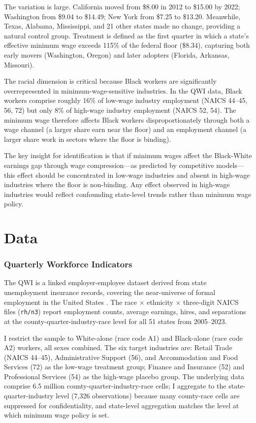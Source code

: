 \documentclass[12pt]{article}
\begin{document}
The variation is large. California moved from \$8.00 in 2012 to \$15.00 by 2022; Washington from \$9.04 to \$14.49; New York from \$7.25 to \$13.20. Meanwhile, Texas, Alabama, Mississippi, and 21 other states made no change, providing a natural control group. Treatment is defined as the first quarter in which a state's effective minimum wage exceeds 115\% of the federal floor (\$8.34), capturing both early movers (Washington, Oregon) and later adopters (Florida, Arkansas, Missouri).

The racial dimension is critical because Black workers are significantly overrepresented in minimum-wage-sensitive industries. In the QWI data, Black workers comprise roughly 16\% of low-wage industry employment (NAICS 44--45, 56, 72) but only 8\% of high-wage industry employment (NAICS 52, 54). The minimum wage therefore affects Black workers disproportionately through both a wage channel (a larger share earn near the floor) and an employment channel (a larger share work in sectors where the floor is binding).

The key insight for identification is that if minimum wages affect the Black-White earnings gap through wage compression---as predicted by competitive models---this effect should be concentrated in low-wage industries and absent in high-wage industries where the floor is non-binding. Any effect observed in high-wage industries would reflect confounding state-level trends rather than minimum wage policy.

\section{Data}
\label{sec:data}

\subsubsection*{Quarterly Workforce Indicators} The QWI is a linked employer-employee dataset derived from state unemployment insurance records, covering the near-universe of formal employment in the United States \citep{AbowdVilhuber2011}. The race $\times$ ethnicity $\times$ three-digit NAICS files (\texttt{rh/n3}) report employment counts, average earnings, hires, and separations at the county-quarter-industry-race level for all 51 states from 2005--2023.

I restrict the sample to White-alone (race code A1) and Black-alone (race code A2) workers, all sexes combined. The six target industries are: Retail Trade (NAICS 44--45), Administrative Support (56), and Accommodation and Food Services (72) as the low-wage treatment group; Finance and Insurance (52) and Professional Services (54) as the high-wage placebo group. The underlying data comprise 6.5 million county-quarter-industry-race cells; I aggregate to the state-quarter-industry level (7,326 observations) because many county-race cells are suppressed for confidentiality, and state-level aggregation matches the level at which minimum wage policy is set.
\end{document}

